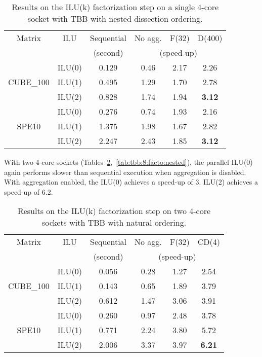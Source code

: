 \begin{table}[!h]
  \renewcommand{\arraystretch}{1.3}
  \caption{Results on the ILU(k) factorization step on a single 4-core
    socket with TBB with nested dissection ordering.}
  \label{tab:tbb:4:facto:nested}
  \centering
  \begin{tabular}{|c|c||c|c|c|c|}
    \hline
    Matrix & ILU & Sequential & No agg. & F(32) & D(400)\\
    &     &  (second)  & \multicolumn{3}{c|}{(speed-up)}\\
    \hline
    \hline
    & ILU(0) & 0.129 & 0.46 & 2.17 & 2.26\\
    CUBE\_100 & ILU(1) & 0.495 & 1.29 & 1.70 & 2.78\\
    & ILU(2) & 0.828 & 1.74 & 1.94 & {\bf 3.12}\\
    \hline
    & ILU(0) & 0.276 & 0.74 & 1.93 & 2.16\\
    SPE10     & ILU(1) & 1.375 & 1.98 & 1.67 & 2.82\\
    & ILU(2) & 2.247 & 2.43 & 1.85 & {\bf 3.12}\\
    \hline
  \end{tabular}
\end{table}

With two 4-core sockets (Tables~\ref{tab:tbb:8:facto:no},~\ref{tab:tbb:8:facto:nested}), the parallel
ILU(0) again performs slower than sequential execution when
aggregation is disabled. With aggregation enabled, the ILU(0)
achieves a speed-up of 3. ILU(2) achieves a speed-up of 6.2.

\begin{table}[!h]
  \renewcommand{\arraystretch}{1.3}
  \caption{Results on the ILU(k) factorization step on two 4-core
    sockets with TBB with natural ordering.}
  \label{tab:tbb:8:facto:no}
  \centering
  \begin{tabular}{|c|c||c|c|c|c|}
    \hline
    Matrix & ILU & Sequential & No agg. & F(32) & CD(4)\\
    &     &  (second)  & \multicolumn{3}{c|}{(speed-up)}\\
    \hline
    \hline
    \hline
    & ILU(0) & 0.056 & 0.28 & 1.27 & 2.54\\
    CUBE\_100 & ILU(1) & 0.143 & 0.65 & 1.89 & 3.79\\
    & ILU(2) & 0.612 & 1.47 & 3.06 & 3.91\\
    \hline
    & ILU(0) & 0.260 & 0.97 & 2.48 & 3.78\\
    SPE10     & ILU(1) & 0.771 & 2.24 & 3.80 & 5.72\\
    & ILU(2) & 2.006 & 3.37 & 3.97 & {\bf 6.21}\\
    \hline
  \end{tabular}
\end{table}


